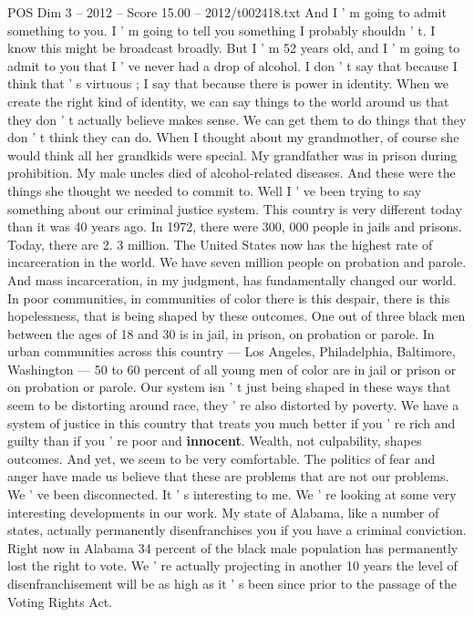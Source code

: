 \begin{textsample}{POS Dim 3 – 2012 – Score 15.00 – 2012/t002418.txt}
And I ' m going to admit something to you.
I ' m going to tell you something I probably shouldn ' t.
I know this might be broadcast broadly.
But I ' m 52 years old, and I ' m going to admit to you that I ' ve never had a drop of alcohol.
I don ' t say that because I think that ' s virtuous ; I say that because there is power in identity.
When we create the right kind of identity, we can say things to the world around us that they don ' t actually believe makes sense.
We can get them to do things that they don ' t think they can do.
When I thought about my grandmother, of course she would think all her grandkids were special.
My grandfather was in prison during prohibition.
My male uncles died of alcohol-related diseases.
And these were the things she thought we needed to commit to.
Well I ' ve been trying to say something about our criminal justice system.
This country is very different today than it was 40 years ago.
In 1972, there were 300, 000 people in jails and prisons.
Today, there are 2. 3 million.
The United States now has the highest rate of incarceration in the world.
We have seven million people on probation and parole.
And mass incarceration, in my judgment, has fundamentally changed our world.
In poor communities, in communities of color there is this despair, there is this hopelessness, that is being shaped by these outcomes.
One out of three black men between the ages of 18 and 30 is in jail, in prison, on probation or parole.
In urban communities across this country — Los Angeles, Philadelphia, Baltimore, Washington — 50 to 60 percent of all young men of color are in jail or prison or on probation or parole.
Our system isn ' t just being shaped in these ways that seem to be distorting around race, they ' re also distorted by poverty.
We have a system of justice in this country that treats you much better if you ' re rich and guilty than if you ' re poor and \textbf{innocent}.
Wealth, not culpability, shapes outcomes.
And yet, we seem to be very comfortable.
The politics of fear and anger have made us believe that these are problems that are not our problems.
We ' ve been disconnected.
It ' s interesting to me.
We ' re looking at some very interesting developments in our work.
My state of Alabama, like a number of states, actually permanently disenfranchises you if you have a criminal conviction.
Right now in Alabama 34 percent of the black male population has permanently lost the right to vote.
We ' re actually projecting in another 10 years the level of disenfranchisement will be as high as it ' s been since prior to the passage of the Voting Rights Act.

\end{textsample}
